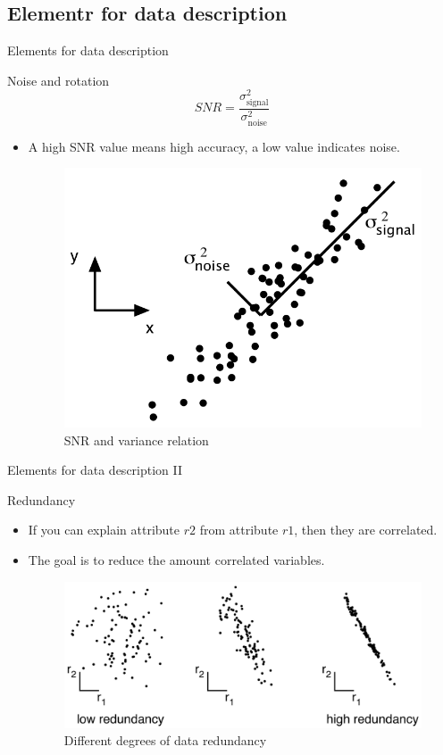 \documentclass[xcolor=x11names,compress,10pt]{beamer}
\renewcommand{\(}{\begin{columns}}
\renewcommand{\)}{\end{columns}}
\newcommand{\<}[1]{\begin{column}{#1}}
\renewcommand{\>}{\end{column}}
\begin{document}
\subsection{Elementr for data description}
\begin{frame}{Elements for data description}
\begin{block}{Noise and rotation}
$$
SNR = \frac{\sigma^2_{\text{signal}}}{\sigma^2_{\text{noise}}}
$$
\begin{itemize}
	\item A high SNR value means high accuracy, a low value indicates noise.
	\begin{figure}
	\centering
	\includegraphics[scale=0.2]{../report/resources/images/snr}
	\caption{SNR and variance relation}
	\label{fig:snr-variance}
\end{figure}
\end{itemize}
\end{block}
\end{frame}

\begin{frame}{Elements for data description II}
\begin{block}{Redundancy}
\begin{itemize}
	\item If you can explain attribute $r2$ from attribute $r1$, then they are correlated.
	\item The goal is to reduce the amount correlated variables.
	\begin{figure}
	\centering
	\includegraphics[scale=0.2]{../report/resources/images/redundancia}
	\caption{Different degrees of data redundancy}
	\label{fig:redundancy}
\end{figure}
\end{itemize}
\end{block}
\end{frame}
\end{document}
